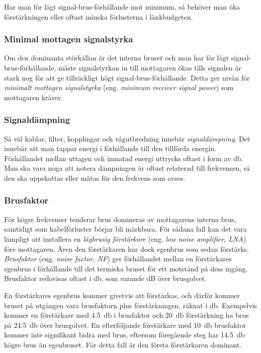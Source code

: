 Har man för lågt signal-brus-förhållande mot minimum, så behöver man öka
förstärkningen eller oftast minska förlusterna i länkbudgeten.

\subsubsection{Minimal mottagen signalstyrka}

Om den dominanta störkällan är det interna bruset och man har för lågt
signal-brus-förhållande, måste signalstyrkan in till mottagaren ökas
tills signalen är stark nog för att ge tillräckligt högt
signal-brus-förhållande.
Detta ger nivån för \emph{minimalt mottagen signalstyrka} (eng.
\emph{minimum receiver signal power}) som mottagaren kräver.

\subsubsection{Signaldämpning}

Så väl kablar, filter, kopplingar och vågutbredning innebär
\emph{signaldämpning}.
Det innebär att man tappar energi i förhållande till den tillförda energin.
Förhållandet mellan uttagen och inmatad energi uttrycks oftast i form av
\unit{\decibel}.
Man ska vara noga att notera dämpningen är oftast relaterad till frekvensen,
så den ska uppskattas eller mätas för den frekvens som avses.

\subsubsection{Brusfaktor}
\label{brusfaktor}

För högre frekvenser tenderar brus domineras av mottagarens interna brus,
samtidigt som kabelförluster börjar bli märkbara.
För sådana fall kan det vara lämpligt att installera en
\emph{lågbrusig förstärkare} (eng. \emph{low noise amplifier, LNA}) före
mottagaren.
Även den förstärkaren har dock egenbrus som sedan förstärks.
\emph{Brusfaktor} (eng. \emph{noise factor, NF}) ger förhållandet mellan en
förstärkares egenbrus i förhållande till det termiska bruset för ett motstånd
på dess ingång.
Brusfaktor redovisas oftast i \unit{\decibel}, som varande dB över brusgolvet.

En förstärkares egenbrus kommer givetvis att förstärkas, och därför kommer
bruset på utgången vara brusfaktorn plus förstärkningen, räknat i \unit{\decibel}.
Exempelvis kommer en förstärkare med \qty{4,5}{\decibel} i brusfaktor och
\qty{20}{\decibel} förstärkning ha brus på \qty{24,5}{\decibel} över brusgolvet.
En efterföljande förstärkare med \qty{10}{\decibel} brusfaktor kommer inte
signifikant bidra med brus, eftersom föregående steg har \qty{14,5}{\decibel}
högre brus än egenbruset.
För detta fall är den första förstärkaren dominant.

